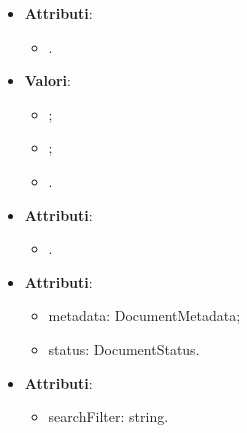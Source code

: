 \documentclass[10pt, a4paper]{article}
\begin{document}
\label{DocumentStatusDettaglio}
\begin{itemize}
    \item \textbf{Attributi}:
    \begin{itemize}
        \item {}.
    \end{itemize}
\end{itemize}

\label{StatusDettaglio}
\begin{itemize}
    \item \textbf{Valori}:
    \begin{itemize}
        \item {};
        \item {};
        \item {}.
    \end{itemize}
\end{itemize}

\label{DocumentIdDettaglio}
\begin{itemize}
    \item \textbf{Attributi}:
    \begin{itemize}
        \item {}.
    \end{itemize}
\end{itemize}

\label{LightDocumentDettaglio}
\begin{itemize}
    \item \textbf{Attributi}:
    \begin{itemize}
        \item metadata: DocumentMetadata;
        \item status: DocumentStatus.
    \end{itemize}
\end{itemize}

\label{DocumentFilterDettaglio}
\begin{itemize}
    \item \textbf{Attributi}:
    \begin{itemize}
        \item searchFilter: string.
    \end{itemize}
\end{itemize}
\end{document}
